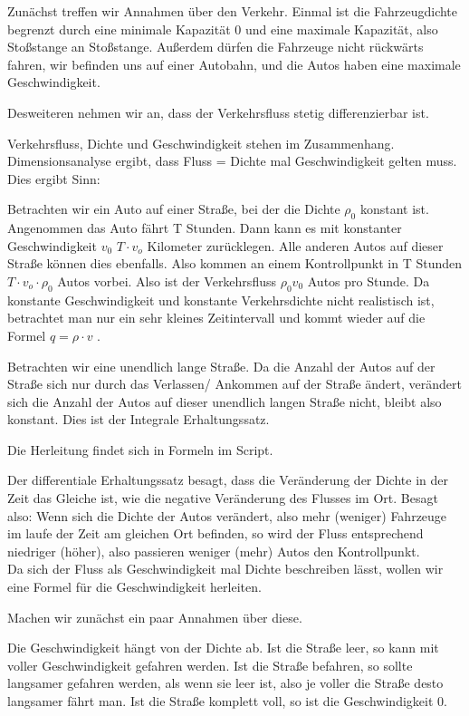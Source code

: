 \documentclass[]{article}
\begin{document}
Zunächst treffen wir Annahmen über den Verkehr. Einmal ist die Fahrzeugdichte begrenzt durch eine minimale Kapazität 0 und eine maximale Kapazität, also Stoßstange an Stoßstange. Außerdem dürfen die Fahrzeuge nicht rückwärts fahren, wir befinden uns auf einer Autobahn, und die Autos haben eine maximale Geschwindigkeit.

Desweiteren nehmen wir an, dass der Verkehrsfluss stetig differenzierbar ist.

Verkehrsfluss, Dichte und Geschwindigkeit stehen im Zusammenhang. Dimensionsanalyse ergibt, dass Fluss = Dichte mal Geschwindigkeit gelten muss. Dies ergibt Sinn: 

Betrachten wir ein Auto auf einer Straße, bei der die Dichte $\rho_0$ konstant ist. Angenommen das Auto fährt T Stunden. Dann kann es mit konstanter Geschwindigkeit $v_0$ $T \cdot v_o$ Kilometer zurücklegen. Alle anderen Autos auf dieser Straße können dies ebenfalls. Also kommen an einem Kontrollpunkt in T Stunden $T \cdot v_o \cdot \rho_0$ Autos vorbei. Also ist der Verkehrsfluss $\rho_0 v_0$ Autos pro Stunde.  Da konstante Geschwindigkeit und konstante Verkehrsdichte nicht realistisch ist, betrachtet man nur ein sehr kleines Zeitintervall und kommt wieder auf die Formel $q= \rho \cdot v$ .   

Betrachten wir eine unendlich lange Straße. Da die Anzahl der Autos auf der Straße sich nur durch das Verlassen/ Ankommen auf der Straße ändert, verändert sich die Anzahl der Autos auf dieser unendlich langen Straße nicht, bleibt also konstant. Dies ist der Integrale Erhaltungssatz. 

Die Herleitung findet sich in Formeln im Script. 

Der differentiale Erhaltungssatz besagt, dass die Veränderung der Dichte in der Zeit das Gleiche ist, wie die negative Veränderung des Flusses im Ort. Besagt also: Wenn sich die Dichte der Autos verändert, also mehr (weniger) Fahrzeuge im laufe der Zeit am gleichen Ort befinden, so wird der Fluss entsprechend niedriger (höher), also passieren weniger (mehr) Autos den Kontrollpunkt. \\

Da sich der Fluss als Geschwindigkeit mal Dichte beschreiben lässt, wollen wir eine Formel für die Geschwindigkeit herleiten.

Machen wir zunächst ein paar Annahmen über diese.  

Die Geschwindigkeit hängt von der Dichte ab. Ist die Straße leer, so kann mit voller Geschwindigkeit gefahren werden. Ist die Straße befahren, so sollte langsamer gefahren werden, als wenn sie leer ist, also je voller die Straße desto langsamer fährt man. Ist die Straße komplett voll, so ist die Geschwindigkeit 0. 
\end{document}
